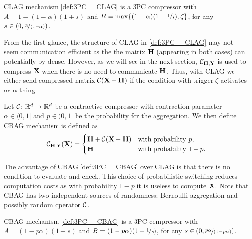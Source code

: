 \documentclass[11pt]{article}
\begin{document}
	\begin{lemma}
		CLAG mechanism \eqref{def:3PC__CLAG} is a 3PC compressor with $A = 1-(1-\alpha)(1+s)$ and $B = \max\{(1-\alpha)(1+\nicefrac{1}{s}),\zeta\}$, for any $s\in(0,\nicefrac{\alpha}{(1-\alpha)})$.
	\end{lemma}
	
	From the first glance, the structure of CLAG in \eqref{def:3PC__CLAG} may not seem communication efficient as the the matrix $\mathbf{H}$ (appearing in both cases) can potentially by dense. However, as we will see in the next section, ${\mathcal{C}}_{\mathbf{H},\mathbf{Y}}$ is used to compress $\mathbf{X}$ when there is no need to communicate $\mathbf{H}$. Thus, with CLAG we either send compressed matrix ${\mathcal{C}}(\mathbf{X}-\mathbf{H})$ if the condition with trigger $\zeta$ activates or nothing.
	
	\begin{example}\label{ex:CBAG}
		Let ${\mathcal{C}}\colon\mathbb{R}^d\to\mathbb{R}^d$ be a contractive compressor with contraction parameter $\alpha\in(0,1]$ and $p\in(0,1]$ be the probability for the aggregation. We then define CBAG mechanism is defined as
		\begin{equation}\label{def:3PC__CBAG}
			{\mathcal{C}}_{\mathbf{H},\mathbf{Y}}(\mathbf{X}) =
			\begin{cases}
				\mathbf{H} + {\mathcal{C}}(\mathbf{X}-\mathbf{H}) & \text{with probability } p,\\
				\mathbf{H} & \text{with probability } 1-p.
			\end{cases}
		\end{equation}
	\end{example}
	
	The advantage of CBAG \eqref{def:3PC__CBAG} over CLAG is that there is no condition to evaluate and check. This choice of probabilistic switching reduces computation costs as with probability $1-p$  it is useless to compute $\mathbf{X}$. Note that CBAG has two independent sources of randomness: Bernoulli aggregation and possibly random operator ${\mathcal{C}}$.
	
	\begin{lemma}\label{lem:3PC__CBAG}
		CBAG mechanism \eqref{def:3PC__CBAG} is a 3PC compressor with $A = (1-p\alpha)(1+s)$ and $B = (1-p\alpha)(1+\nicefrac{1}{s})$, for any $s\in(0,\nicefrac{p\alpha}{(1-p\alpha)})$.
	\end{lemma}
	
\end{document}
